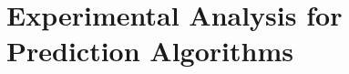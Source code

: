 \section{Experimental Analysis for Prediction Algorithms}
\label{sec:experiment design}



















